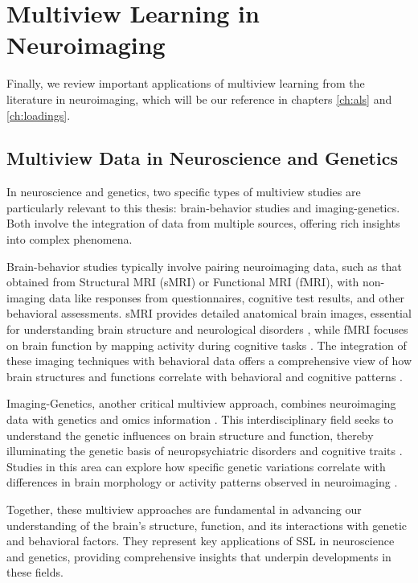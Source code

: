 \section{Multiview Learning in Neuroimaging}

Finally, we review important applications of multiview learning from the literature in neuroimaging, which will be our reference in chapters \ref{ch:als} and \ref{ch:loadings}.

\subsection{Multiview Data in Neuroscience and Genetics}

In neuroscience and genetics, two specific types of multiview studies are particularly relevant to this thesis: brain-behavior studies and imaging-genetics.
Both involve the integration of data from multiple sources, offering rich insights into complex phenomena.

Brain-behavior studies typically involve pairing neuroimaging data, such as that obtained from Structural MRI (sMRI) or Functional MRI (fMRI), with non-imaging data like responses from questionnaires, cognitive test results, and other behavioral assessments.
sMRI provides detailed anatomical brain images, essential for understanding brain structure and neurological disorders \citep{kanai2011structural}, while fMRI focuses on brain function by mapping activity during cognitive tasks \citep{miranda2021systematic}.
The integration of these imaging techniques with behavioral data offers a comprehensive view of how brain structures and functions correlate with behavioral and cognitive patterns \citep{rypma2001age,genon2022linking}.

Imaging-Genetics, another critical multiview approach, combines neuroimaging data with genetics and omics information \citep{le2008sparse}.
This interdisciplinary field seeks to understand the genetic influences on brain structure and function, thereby illuminating the genetic basis of neuropsychiatric disorders and cognitive traits \citep{bogdan2017imaging}.
Studies in this area can explore how specific genetic variations correlate with differences in brain morphology or activity patterns observed in neuroimaging \citep{liu2014review}.

Together, these multiview approaches are fundamental in advancing our understanding of the brain's structure, function, and its interactions with genetic and behavioral factors.
They represent key applications of SSL in neuroscience and genetics, providing comprehensive insights that underpin developments in these fields.

